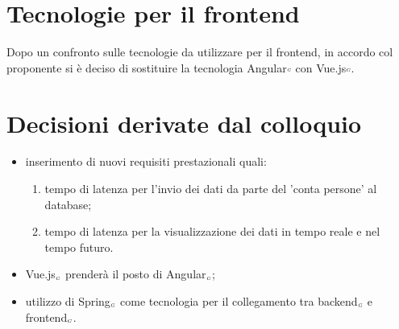 \section{Tecnologie per il frontend}
Dopo un confronto sulle tecnologie da utilizzare per il frontend, in accordo col proponente si è deciso di sostituire la tecnologia Angular${\scaleto{G}{3pt}}$ con Vue.js${\scaleto{G}{3pt}}$.

\section{Decisioni derivate dal colloquio}
\begin{itemize}
	\item inserimento di nuovi requisiti prestazionali quali:
		\begin{enumerate}
			\item tempo di latenza per l'invio dei dati da parte del 'conta persone' al database;
			\item tempo di latenza per la visualizzazione dei dati in tempo reale e nel tempo futuro.
		\end{enumerate}
	\item Vue.js$_{\scaleto{G}{3pt}}$ prenderà il posto di Angular$_{\scaleto{G}{3pt}}$;
	\item utilizzo di Spring$_{\scaleto{G}{3pt}}$ come tecnologia per il collegamento tra backend$_{\scaleto{G}{3pt}}$ e frontend$_{\scaleto{G}{3pt}}$.
\end{itemize}

